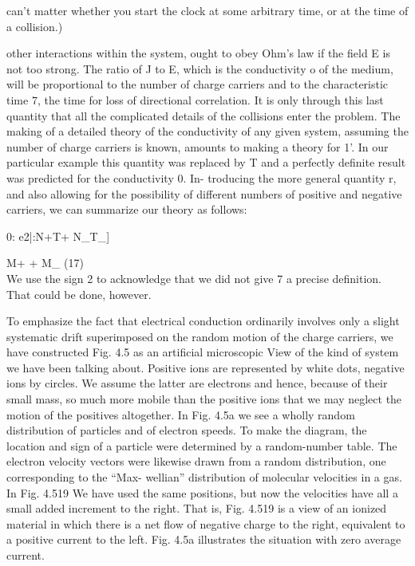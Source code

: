 can't matter whether you start the clock at some arbitrary time, or at the time of a
collision.)

other interactions within the system, ought to obey Ohm's law if the
field E is not too strong. The ratio of J to E, which is the conductivity
o of the medium, will be proportional to the number of charge
carriers and to the characteristic time 7, the time for loss of directional
correlation. It is only through this last quantity that all the
complicated details of the collisions enter the problem. The making
of a detailed theory of the conductivity of any given system, assuming
the number of charge carriers is known, amounts to making a theory
for 1'. In our particular example this quantity was replaced by T and
a perfectly definite result was predicted for the conductivity 0. In-
troducing the more general quantity r, and also allowing for the
possibility of different numbers of positive and negative carriers, we
can summarize our theory as follows:

0: e2|:N+T+ N_T_]

M+ + M_ (17)
\begin{equation}
\end{equation}
We use the sign 2 to acknowledge that we did not give 7 a precise
definition. That could be done, however.

To emphasize the fact that electrical conduction ordinarily involves
only a slight systematic drift superimposed on the random motion
of the charge carriers, we have constructed Fig. 4.5 as an artificial
microscopic View of the kind of system we have been talking about.
Positive ions are represented by white dots, negative ions by circles.
We assume the latter are electrons and hence, because of their small
mass, so much more mobile than the positive ions that we may neglect
the motion of the positives altogether. In Fig. 4.5a we see a wholly
random distribution of particles and of electron speeds. To make
the diagram, the location and sign of a particle were determined by a
random-number table. The electron velocity vectors were likewise
drawn from a random distribution, one corresponding to the ``Max-
wellian'' distribution of molecular velocities in a gas. In Fig. 4.519
We have used the same positions, but now the velocities have all a
small added increment to the right. That is, Fig. 4.519 is a view of
an ionized material in which there is a net flow of negative charge to
the right, equivalent to a positive current to the left. Fig. 4.5a illustrates
the situation with zero average current.

